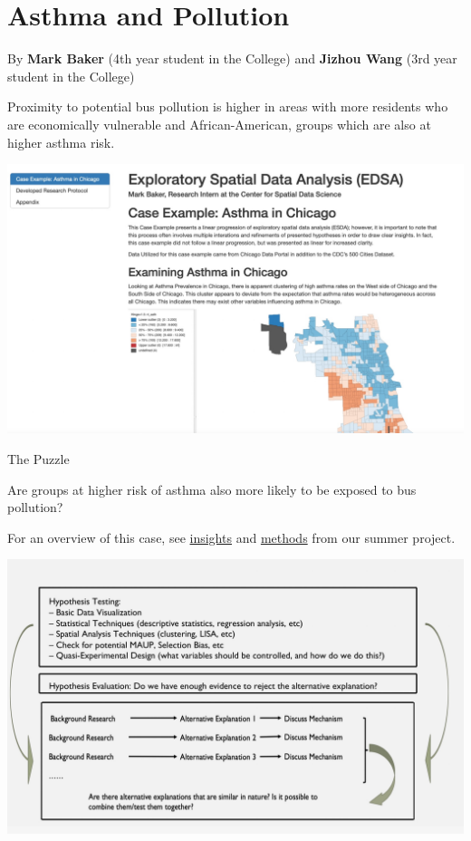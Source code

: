 \documentclass[
]{book}
\begin{document}
\hypertarget{asthma-and-pollution}{%
\section{Asthma and Pollution}\label{asthma-and-pollution}}

By \textbf{Mark Baker} (4th year student in the College) and \textbf{Jizhou Wang} (3rd year student in the College)

Proximity to potential bus pollution is higher in areas with more residents who are economically vulnerable and African-American, groups which are also at higher asthma risk.

\includegraphics{images/asthma1.jpg}

The Puzzle

Are groups at higher risk of asthma also more likely to be exposed to bus pollution?

For an overview of this case, see \href{https://uchicago.box.com/s/zmoyz07zwu2opnuovfrogge6ckkwjtpq}{insights} and \href{https://uchicago.box.com/s/1zo055jgec3sxrygvr0unrtsr8ptvb8v}{methods} from our summer project.

\includegraphics{images/asthma2.jpg}
\end{document}

